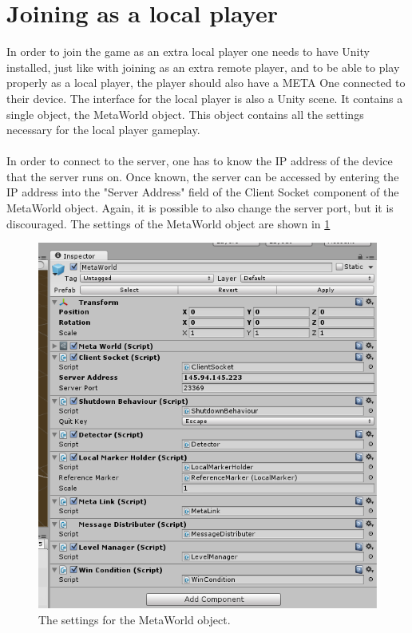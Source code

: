 \documentclass[]{report}
\begin{document}
\section*{Joining as a local player}
In order to join the game as an extra local player one needs to have Unity
installed, just like with joining as an extra remote player, and to be able
to play properly as a local player, the player should also have a META One
connected to their device. The interface for the local player is also
a Unity scene. It contains a single object, the MetaWorld object. This object
contains all the settings necessary for the local player gameplay.\\
\\
In order to connect to the server, one has to know the IP address of the
device that the server runs on. Once known, the server can be accessed by
entering the IP address into the "Server Address" field of the Client Socket
component of the MetaWorld object. Again, it is possible to also change the
server port, but it is discouraged. The settings of the MetaWorld object
are shown in \ref{fig:metaworld}

\begin{figure}[!ht]
    \centering
    \includegraphics[scale = 0.6]{MetaWorld}
    \caption{The settings for the MetaWorld object.}
    \label{fig:metaworld}
\end{figure}
\end{document}
